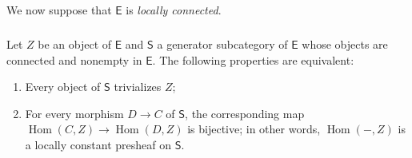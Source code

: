 \documentclass[10pt,oneside]{amsart}
\newcommand{\oldpage}[1]{\marginnote{\textbf{#1}}}
\newcommand{\cat}{\mathsf}
\DeclareMathOperator{\Hom}{Hom}
\begin{document}
\subsection{}
We now suppose that $\cat{E}$ is \emph{locally connected}.

\subsubsection{}
Let $Z$ be an object of $\cat{E}$ and $\cat{S}$ a generator subcategory of $\cat{E}$ whose objects are connected and nonempty in $\cat{E}$.
The following properties are equivalent:
\oldpage{8}
\begin{enumerate}[label=(\alph*)]
  \item Every object of $\cat{S}$ trivializes $Z$;
  \item For every morphism $D\to C$ of $\cat{S}$, the corresponding map $\Hom(C,Z)\to\Hom(D,Z)$ is bijective;
    in other words, $\Hom(-,Z)$ is a locally constant presheaf on $\cat{S}$.
\end{enumerate}
\end{document}
